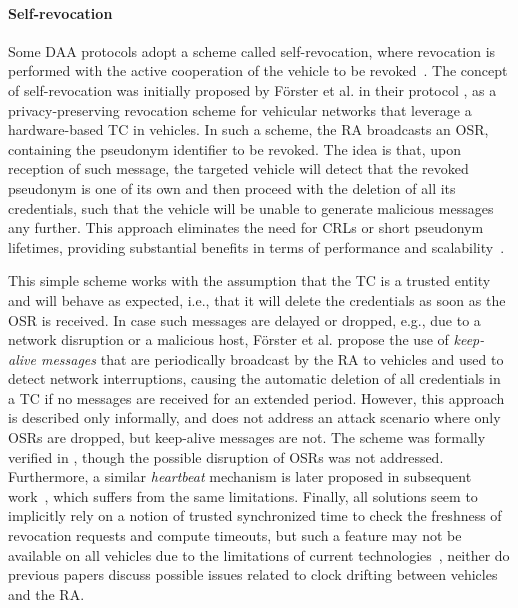 \paragraph{Self-revocation}
%
Some \ac{DAA} protocols adopt a scheme called self-revocation, where revocation
is performed with the active cooperation of the vehicle to be
revoked~\cite{whitefield2017privacy,desmoulins2019practical,larsen2021daa}. The
concept of self-revocation was initially proposed by F\"orster et al. in their
\rewire{} protocol \cite{forster2015rewire}, as a privacy-preserving revocation
scheme for vehicular networks that leverage a hardware-based \ac{TC} in
vehicles.
In such a scheme, the \ac{RA} broadcasts an \ac{OSR}, containing the pseudonym
identifier to be revoked. The idea is that, upon reception of such message, the
targeted vehicle will detect that the revoked pseudonym is one of its own and
then proceed with the deletion of all its credentials, such that the vehicle
will be unable to generate malicious messages any further. This approach
eliminates the need for \acp{CRL} or short pseudonym lifetimes, providing
substantial benefits in terms of performance and
scalability~\cite{angelogianni2023comparative}.

This simple scheme works with the assumption that the \ac{TC} is a trusted
entity and will behave as expected, i.e., that it will delete the credentials as
soon as the \ac{OSR} is received. In case such messages are delayed or dropped,
e.g., due to a network disruption or a malicious host, F\"orster et al.  propose
the use of \emph{keep-alive messages} that are periodically broadcast by the
\ac{RA} to vehicles and used to detect network interruptions, causing the
automatic deletion of all credentials in a \ac{TC} if no messages are received
for an extended period. However, this approach is described only informally, and
does not address an attack scenario where only \acp{OSR} are dropped, but
keep-alive messages are not. The \rewire{} scheme was formally verified in
\cite{whitefield2017formal}, though the possible disruption of \acp{OSR} was not
addressed. Furthermore, a similar \emph{heartbeat} mechanism is later proposed
in subsequent
work~\cite{whitefield2017privacy,desmoulins2019practical,larsen2021daa}, which
suffers from the same limitations. Finally, all solutions seem to implicitly
rely on a notion of trusted synchronized time to check the freshness of
revocation requests and compute timeouts, but such a feature may not be
available on all vehicles due to the limitations of current
technologies~\cite{alder2023about,anwar2019applications}, neither do previous
papers discuss possible issues related to clock drifting between vehicles and
the \ac{RA}.


